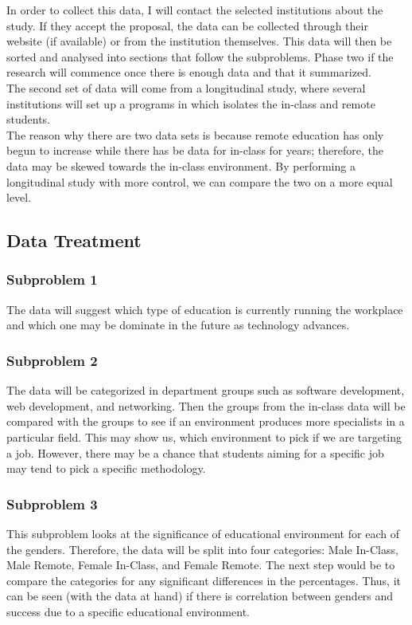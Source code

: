 \documentclass[titlepage]{article}
\begin{document}
\noindent In order to collect this data, I will contact the selected institutions about the study.
If they accept the proposal, the data can be collected through their website (if available) or
from the institution themselves. This data will then be sorted and analysed into sections that follow
the subproblems.  Phase two if the research will commence once there is enough data and that it summarized.\\

\noindent The second set of data will come from a longitudinal study, where several institutions will
set up a programs in which isolates the in-class and remote students.  \\

\noindent The reason why there are two data sets is because remote education has only begun to
increase while there has be data for in-class for years; therefore, the data may be skewed towards
the in-class environment.  By performing a longitudinal study with more control, we can compare
the two on a more equal level.\\

\clearpage

\subsection{Data Treatment}

\subsubsection{Subproblem 1}
The data will suggest which type of education is currently running the workplace and which one
may be dominate in the future as technology advances.

\subsubsection{Subproblem 2}
The data will be categorized in department groups such as software development, web development, and
networking.  Then the groups from the in-class data will be compared with the groups to see if an
environment produces more specialists in a particular field.  This may show us, which environment
to pick if we are targeting a job.  However, there may be a chance that students aiming for a
specific job may tend to pick a specific methodology.

\subsubsection{Subproblem 3}
This subproblem looks at the significance of educational environment for each of the genders.
Therefore, the data will be split into four categories: Male In-Class, Male Remote, Female In-Class,
and Female Remote.  The next step would be to compare the categories for any significant differences
in the percentages.  Thus, it can be seen (with the data at hand) if there is correlation between
genders and success due to a specific educational environment.
\end{document}
